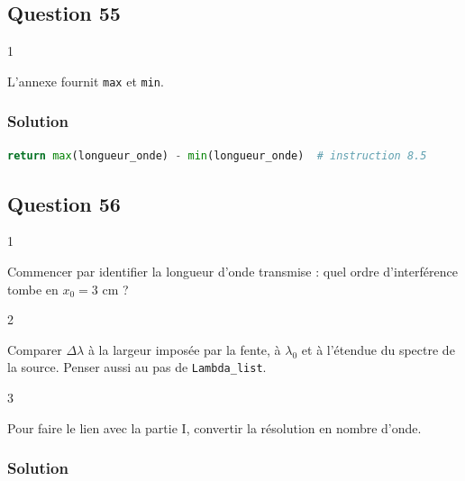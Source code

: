 \documentclass[11pt,a4paper]{article}
\begin{document}
\hypertarget{question-55}{%
\subsection{Question 55}\label{question-55}}

\begin{indication}{1}

L'annexe fournit \texttt{max} et \texttt{min}.

\end{indication}

\hypertarget{solution-54}{%
\subsubsection{Solution}\label{solution-54}}

\begin{lstlisting}[language=Python]
    return max(longueur_onde) - min(longueur_onde)  # instruction 8.5
\end{lstlisting}

\hypertarget{question-56}{%
\subsection{Question 56}\label{question-56}}

\begin{indication}{1}

Commencer par identifier la longueur d'onde transmise : quel ordre d'interférence tombe en \(x_0=3\) cm ?

\end{indication}

\begin{indication}{2}

Comparer \(\Delta\lambda\) à la largeur imposée par la fente, à \(\lambda_0\) et à l'étendue du spectre de la source. Penser aussi au pas de \texttt{Lambda\_list}.

\end{indication}

\begin{indication}{3}

Pour faire le lien avec la partie I, convertir la résolution en nombre d'onde.

\end{indication}

\hypertarget{solution-55}{%
\subsubsection{Solution}\label{solution-55}}
\end{document}
